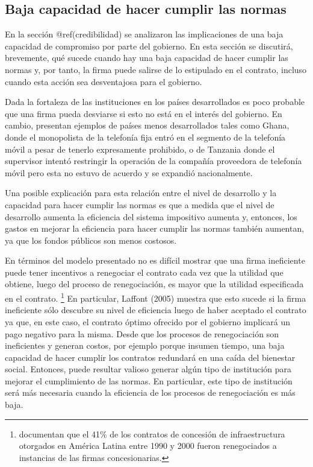 \documentclass[
  12pt,
  spanish,
]{book}
\begin{document}
\hypertarget{baja-capacidad-de-hacer-cumplir-las-normas}{%
\subsection{Baja capacidad de hacer cumplir las
normas}\label{baja-capacidad-de-hacer-cumplir-las-normas}}

En la sección @ref(credibilidad) se analizaron las implicaciones de una
baja capacidad de compromiso por parte del gobierno. En esta sección se
discutirá, brevemente, qué sucede cuando hay una baja capacidad de hacer
cumplir las normas y, por tanto, la firma puede salirse de lo estipulado
en el contrato, incluso cuando esta acción sea desventajosa para el
gobierno.

Dada la fortaleza de las instituciones en los países desarrollados es
poco probable que una firma pueda desviarse si esto no está en el
interés del gobierno. En cambio, \citet{Estache2009} presentan ejemplos
de países menos desarrollados tales como Ghana, donde el monopolista de
la telefonía fija entró en el segmento de la telefonía móvil a pesar de
tenerlo expresamente prohibido, o de Tanzania donde el supervisor
intentó restringir la operación de la compañía proveedora de telefonía
móvil pero esta no estuvo de acuerdo y se expandió nacionalmente.

Una posible explicación para esta relación entre el nivel de desarrollo
y la capacidad para hacer cumplir las normas es que a medida que el
nivel de desarrollo aumenta la eficiencia del sistema impositivo aumenta
y, entonces, los gastos en mejorar la eficiencia para hacer cumplir las
normas también aumentan, ya que los fondos públicos son menos costosos.

En términos del modelo presentado no es difícil mostrar que una firma
ineficiente puede tener incentivos a renegociar el contrato cada vez que
la utilidad que obtiene, luego del proceso de renegociación, es mayor
que la utilidad especificada en el contrato. \footnote{\citet{Guasch2006}
  documentan que el 41\% de los contratos de concesión de
  infraestructura otorgados en América Latina entre 1990 y 2000 fueron
  renegociados a instancias de las firmas concesionarias.} En
particular, Laffont (2005) muestra que esto sucede si la firma
ineficiente sólo descubre su nivel de eficiencia luego de haber aceptado
el contrato ya que, en este caso, el contrato óptimo ofrecido por el
gobierno implicará un pago negativo para la misma. Desde que los
procesos de renegociación son ineficientes y generan costos, por ejemplo
porque insumen tiempo, una baja capacidad de hacer cumplir los contratos
redundará en una caída del bienestar social. Entonces, puede resultar
valioso generar algún tipo de institución para mejorar el cumplimiento
de las normas. En particular, este tipo de institución será más
necesaria cuando la eficiencia de los procesos de renegociación es más
baja.
\end{document}
